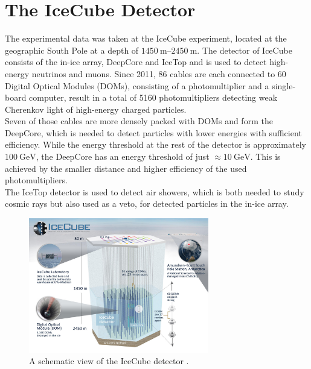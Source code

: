 \section{The IceCube Detector}
\label{sec:Detector}

The experimental data was taken at the IceCube experiment, located at the geographic South Pole at a depth of $\qtyrange{1450}{2450}{\metre}$.
The detector of IceCube consists of the in-ice array, DeepCore and IceTop and is used to detect high-energy neutrinos and muons. Since 2011,
86 cables are each connected to 60 Digital Optical Modules (DOMs), consisting of a photomultiplier and a single-board computer, result in a total 
of 5160 photomultipliers detecting weak Cherenkov light of high-energy charged particles.\\
Seven of those cables are more densely packed with DOMs and form the DeepCore, which is needed to detect particles with lower energies with sufficient efficiency. While 
the energy threshold at the rest of the detector is approximately $\qty{100}{\giga\electronvolt}$, the DeepCore has an energy threshold of just $\approx \qty{10}{\giga\electronvolt}$.
This is achieved by the smaller distance and higher efficiency of the used photomultipliers.\\
The IceTop detector is used to detect air showers, which is both needed to study cosmic rays but also used as a veto, for detected particles in the in-ice array.
\begin{figure}
    \centering
    \includegraphics[width=0.7\textwidth]{content/pics/icecube_detector.jpg}
    \caption{A schematic view of the IceCube detector \cite{IceCube_pic}.}
    \label{fig:bb_oscillation}
\end{figure}

